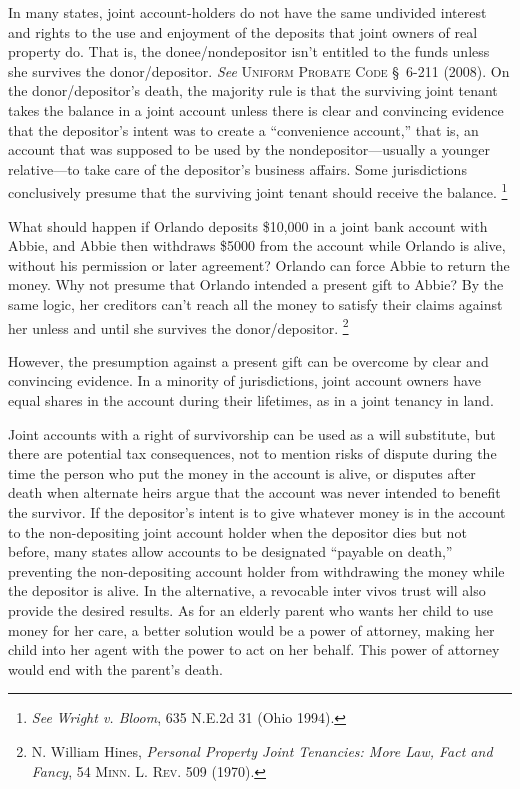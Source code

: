 In many states, joint account-holders do not have the same undivided interest
and rights to the use and enjoyment of the deposits that joint owners of real
property do. That is, the donee/nondepositor isn't entitled to the funds
unless she survives the donor/depositor. \emph{See} \textsc{Uniform Probate
Code} \S~6-211
(2008). On the donor/depositor's death, the majority rule is that the
surviving joint tenant takes the balance in a joint account unless there is
clear and convincing evidence that the depositor's intent was to create a
``convenience account,'' that is, an account that was supposed to be used by
the nondepositor---usually a younger relative---to take care of the
depositor's business affairs. Some jurisdictions conclusively presume that the
surviving joint tenant should receive the balance. \footnote{\emph{See}
\emph{Wright v. Bloom}, 635 N.E.2d 31 (Ohio 1994).}



What should happen if Orlando deposits \$10,000 in a joint bank account with
Abbie, and Abbie then withdraws \$5000 from the account while Orlando is alive,
without his permission or later agreement? Orlando can force Abbie to return
the money. Why not presume that Orlando intended a present gift to Abbie? By
the same logic, her creditors can't reach all the money to satisfy their claims
against her unless and until she survives the donor/depositor. \footnote{N.
William Hines, \emph{Personal Property Joint Tenancies: More Law, Fact and
Fancy}, 54 \textsc{Minn. L. Rev.} 509 (1970).}



However, the presumption against a present gift can be overcome by clear and
convincing evidence. In a minority of jurisdictions, joint account owners have
equal shares in the account during their lifetimes, as in a joint tenancy in
land.



Joint accounts with a right of survivorship can be used as a will substitute,
but there are potential tax consequences, not to mention risks of dispute
during the time the person who put the money in the account is alive, or
disputes after death when alternate heirs argue that the account was never
intended to benefit the survivor. If the depositor's intent is to give
whatever money is in the account to the non-depositing joint account holder
when the depositor dies but not before, many states allow accounts to be
designated ``payable on death,'' preventing the non-depositing account holder
from withdrawing the money while the depositor is alive. In the alternative, a
revocable inter vivos trust will also provide the desired results. As for an
elderly parent who wants her child to use money for her care, a better solution
would be a power of attorney, making her child into her agent with the power to
act on her behalf. This power of attorney would end with the parent's death.



